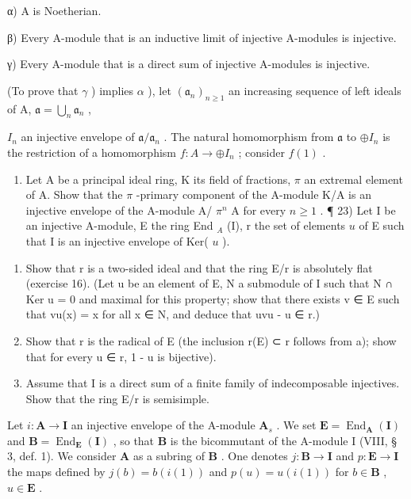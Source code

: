 α) A is Noetherian.

β) Every A-module that is an inductive limit of injective A-modules is injective.

γ) Every A-module that is a direct sum of injective A-modules is injective.

(To prove that \(\gamma\) ) implies \(\alpha\) ), let \((\mathfrak{a}_n)_{n\geqslant 1}\) an increasing sequence of left ideals of A, \(\mathfrak{a} = \bigcup_{n}\mathfrak{a}_{n}\) ,

\(I_{n}\) an injective envelope of \(\mathfrak{a}/\mathfrak{a}_{n}\) . The natural homomorphism from \(\mathfrak{a}\) to \(\oplus I_{n}\) is the restriction of a homomorphism \(f: A \to \oplus I_{n}\) ; consider \(f(1)\) .

\begin{enumerate}
\def\labelenumi{\arabic{enumi})}
\setcounter{enumi}{21}
\tightlist
\item
  Let A be a principal ideal ring, K its field of fractions, \(\pi\) an extremal element of A. Show that the \(\pi\) -primary component of the A-module K/A is an injective envelope of the A-module A/ \(\pi^n\) A for every \(n \geqslant 1\) . ¶ 23) Let I be an injective A-module, E the ring End \(_A\) (I), r the set of elements \(u\) of E such that I is an injective envelope of Ker( \(u\) ).
\end{enumerate}

\begin{enumerate}
\def\labelenumi{\alph{enumi})}
\item
  Show that r is a two-sided ideal and that the ring E/r is absolutely flat (exercise 16). (Let u be an element of E, N a submodule of I such that N ∩ Ker u = 0 and maximal for this property; show that there exists v ∈ E such that vu(x) = x for all x ∈ N, and deduce that uvu - u ∈ r.)
\item
  Show that r is the radical of E (the inclusion r(E) ⊂ r follows from a); show that for every u ∈ r, 1 - u is bijective).
\item
  Assume that I is a direct sum of a finite family of indecomposable injectives. Show that the ring E/r is semisimple.
\end{enumerate}

Let \(i: \mathbf{A} \to \mathbf{I}\) an injective envelope of the A-module \(\mathbf{A}_{s}\) . We set \(\mathbf{E} = \operatorname{End}_{\mathbf{A}}(\mathbf{I})\) and \(\mathbf{B} = \operatorname{End}_{\mathbf{E}}(\mathbf{I})\) , so that \(\mathbf{B}\) is the bicommutant of the A-module I (VIII, § 3, def. 1). We consider \(\mathbf{A}\) as a subring of \(\mathbf{B}\) . One denotes \(j: \mathbf{B} \to \mathbf{I}\) and \(p: \mathbf{E} \to \mathbf{I}\) the maps defined by \(j(b) = b(i(1))\) and \(p(u) = u(i(1))\) for \(b \in \mathbf{B}\) , \(u \in \mathbf{E}\) .

